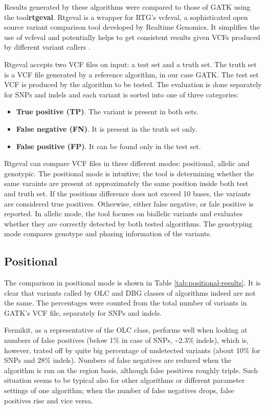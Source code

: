 Results generated by these algorithms were compared to those of GATK using the tool\textbf{rtgeval}. Rtgeval is a wrapper for RTG's vcfeval, a sophisticated open source variant comparison tool developed by Realtime Genomics. It simplifies the use of vcfeval and potentially helps to get consistent results given VCFs produced by different variant callers \cite{rtgeval}.

Rtgeval accepts two VCF files on input: a test set and a truth set. The truth set is a VCF file generated by a reference algorithm, in our case GATK. The test set VCF is produced by the algorithm to be tested. The evaluation is done separately for SNPs and indels and each variant is sorted into one of three categories:
\begin{itemize}
\item \textbf{True positive (TP)}. The variant is present in both sets.
\item \textbf{False negative (FN)}. It is present in the truth set only.
\item \textbf{False positive (FP)}. It can be found only in the test set.
\end{itemize}

Rtgeval can compare VCF files in three different modes: positional, allelic and genotypic. The positional mode is intuitive; the tool is determining whether the same varaints are present at approximately the same position inside both test and truth set. If the positions difference does not exceed 10 bases, the variants are considered true positives. Otherwise, either false negative, or fale positive is reported. In allelic mode, the tool focuses on biallelic variants and evaluates whether they are correctly detected by both tested algorithms. The genotyping mode compares genotype and phasing information of the variants.

\subsection{Positional}
\label{subsec:positional-results}

The comparison in positional mode is shown in Table \ref{tab:positional-results}. It is clear that variants called by OLC and DBG classes of algorithms indeed are not the same. The percentages were counted from the total number of variants in GATK's VCF file, separately for SNPs and indels.

Fermikit, as a representative of the OLC class, performs well when looking at numbers of false positives (below 1\% in case of SNPs, \textasciitilde 2.3\% indels), which is, however, trated off by quite  big percentage of undetected variants (about 10\% for SNPs and 28\% indels). Numbers of false negatives are reduced when the algorithm is run on the region basis, although false positives roughly triple. Such situation seems to be typical also for other algorithms or different parameter settings of one algorithm; when the number of false negatives drops, false positives rise and vice versa.

